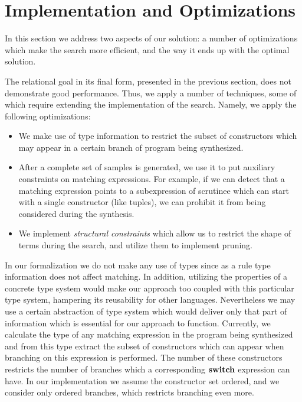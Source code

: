\section{Implementation and Optimizations}
\label{sec:optimization}

In this section we address two aspects of our solution: a number of optimizations which make the search more efficient, and
the way it ends up with the optimal solution.

The relational goal in its final form, presented in the previous section, does not demonstrate good performance. Thus, we apply a number
of techniques, some of which require extending the implementation of the search. Namely, we apply the following optimizations:

\begin{itemize}
\item We make use of type information to restrict the subset of constructors which may appear in a certain branch of
  program being synthesized.
\item After a complete set of samples is generated, we use it to put auxiliary constraints on matching expressions. For example,
  if we can detect that a matching expression points to a subexpression of scrutinee which can start with a single constructor (like
  tuples), we can prohibit it from being considered during the synthesis.
\item We implement \emph{structural constraints} which allow us to restrict the shape of terms during the search, and
  utilize them to implement pruning.
\end{itemize}

In our formalization we do not make any use of types since as a rule type information does not affect matching. In addition,
utilizing the properties of a concrete type system would make our approach too coupled with this particular type system, hampering
its reusability for other languages. Nevertheless we may use a certain abstraction of type system which would deliver only
that part of information which is essential for our approach to function. Currently, we calculate the type of any matching expression in
the program being synthesized and from this type extract the subset of constructors which can appear when branching on this expression
is performed. The number of these constructors restricts the number of branches which a corresponding $\mathbf{switch}$ expression can have.
In our implementation we assume the constructor set ordered, and we consider only ordered branches, which restricts branching even more.


